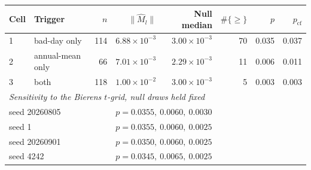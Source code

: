 \begin{tabular}{llrrrrrr}
\toprule
Cell & Trigger & $n$ & $\|\hat M_l\|$ & Null median & $\#\{\ge\}$ & $p$ & $p_{\mathrm{cf}}$ \\
\midrule
1 & bad-day only & 114 & $6.88 \times 10^{-3}$ & $3.00 \times 10^{-3}$ & 70 & 0.035 & 0.037 \\
2 & annual-mean only & 66 & $7.01 \times 10^{-3}$ & $2.29 \times 10^{-3}$ & 11 & 0.006 & 0.011 \\
3 & both & 118 & $1.00 \times 10^{-2}$ & $3.00 \times 10^{-3}$ & 5 & 0.003 & 0.003 \\
\midrule
\multicolumn{8}{l}{\textit{Sensitivity to the Bierens $t$-grid, null draws held fixed}} \\
\multicolumn{3}{l}{seed 20260805} & \multicolumn{5}{l}{$p = 0.0355,\ 0.0060,\ 0.0030$} \\
\multicolumn{3}{l}{seed 1} & \multicolumn{5}{l}{$p = 0.0355,\ 0.0060,\ 0.0025$} \\
\multicolumn{3}{l}{seed 20260901} & \multicolumn{5}{l}{$p = 0.0350,\ 0.0060,\ 0.0025$} \\
\multicolumn{3}{l}{seed 4242} & \multicolumn{5}{l}{$p = 0.0345,\ 0.0065,\ 0.0025$} \\
\bottomrule
\end{tabular}
